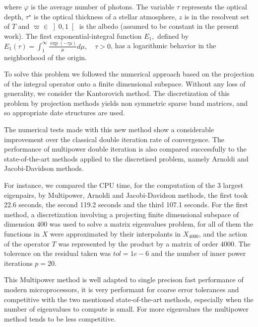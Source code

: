 \documentclass{report}
\begin{document}
\noindent where $\varphi$ is the average number of photons.
The variable $\tau$ represents
the optical depth, $\tau^{\star}$ is the optical thickness of a stellar
atmosphere, $z$ is in the resolvent set of $T$ and $\varpi\in\left]
0,1\right[ $ is the albedo (assumed to be constant in the present work).
The first exponential-integral function $E_{1},$ defined by
$E_{1}(\tau)=\int_{1}^{\infty}\frac{\exp(-\tau\mu)}{\mu}d\mu,\quad\tau>0$,
has a logarithmic behavior in the neighborhood of the origin.

To solve this problem we followed the numerical approach based on the
projection of the integral operator onto a finite dimensional subspace.
Without any loss of generality, we consider the Kantorovich method.
The discretization of this problem by projection methods
yields non symmetric sparse band matrices, and so appropriate date structures are used.

The numerical tests made with this new method show a considerable
improvement over the classical double iteration rate of convergence.
The performance of multipower double iteration is also compared
successfully to the state-of-the-art methods applied to the discretised
problem, namely Arnoldi and Jacobi-Davidson methods.

For instance, we compared the CPU time, for the computation
of the 3 largest eigenpairs, by Multipower, Arnoldi and Jacobi-Davidson methods,
the first took 22.6 seconds, the second 119.2 seconds and the third 107.1 seconds.
For the first method, a discretization involving a projecting finite
dimensional subspace of dimension $400$ was used to solve a matrix
eigenvalues problem,
for all of them the functions in $X$ were approximated by their
interpolants in $X_{4000}$, and the action of the operator $T$ was
represented by the product by a matrix of order $4000$. The tolerence on
the residual taken was $tol=1e-6$ and the number of inner power
iterations $p=20$.

This Multipower method is well adapted to single precison fast
performance of modern microprocessors, it is very
performant for coarse error tolerances and competitive with the two mentioned
state-of-the-art methods, especially when the number of eigenvalues to compute
is small. For more eigenvalues the multipower method tends to be less competitive.
\end{document}
